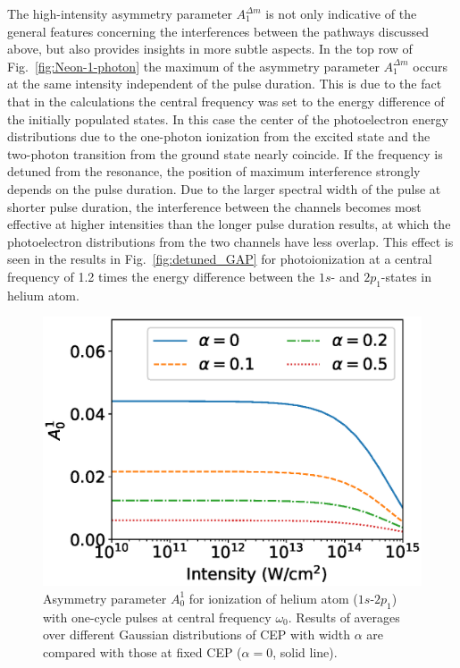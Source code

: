The high-intensity asymmetry parameter $A_1^{\Delta m}$ is not only indicative of the general features concerning the interferences between the pathways discussed above, but also provides insights in more subtle aspects. In the top row of Fig.~\ref{fig:Neon-1-photon} the maximum of the asymmetry parameter $A_1^{\Delta m}$ occurs at the same intensity independent of the pulse duration. This is due to the fact that in the calculations the central frequency was set to the energy difference of the initially populated states. In this case the center of the photoelectron energy distributions due to the one-photon ionization from the excited state and the two-photon transition from the ground state nearly coincide. If the frequency is detuned from the resonance, the position of maximum interference strongly depends on the pulse duration. Due to the larger spectral width of the pulse at shorter pulse duration, the interference between the channels becomes most effective at higher intensities than the longer pulse duration results, at which the photoelectron distributions from the two channels have less overlap. This effect is seen in the results in Fig.\ \ref{fig:detuned_GAP} for photoionization at a central frequency of 1.2 times the energy difference between the $1s$- and $2p_1$-states in helium atom. 

\begin{figure}[t]
\centering
\includegraphics[width=.45\linewidth]{figs/Photo_ionization/GAP/He_2p1_asym_alpha.eps}
\caption{
Asymmetry parameter $A_0^1$ for ionization of helium atom ($1s$-$2p_1$) with one-cycle pulses at central frequency $\omega_0$. Results of averages over different Gaussian distributions of CEP with width $\alpha$ are compared with those at fixed CEP ($\alpha =0$, solid line).
} 
  \label{fig:cep_avg}
\end{figure}

